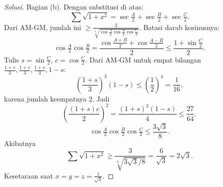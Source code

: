 \documentclass[12pt]{scrartcl}
\begin{document}
\begin{enumerate}
\begin{proof}[Solusi]
	Bagian (b). Dengan substitusi di atas:
	\[ \sum\sqrt{1+x^2} = \sec\tfrac{A}{2} + \sec\tfrac{B}{2} + \sec\tfrac{C}{2}. \]
	Dari AM-GM, jumlah ini $\ge \frac{3}{\sqrt[3]{\cos\frac{A}{2}\cos\frac{B}{2}\cos\frac{C}{2}}}$.
	Batasi darab kosinusnya:
	\[ \cos\tfrac{A}{2}\cos\tfrac{B}{2}
	= \frac{\cos\frac{A+B}{2}+\cos\frac{A-B}{2}}{2}
	\le \frac{1+\sin\frac{C}{2}}{2}. \]
	Tulis $s = \sin\frac{C}{2}$, $c = \cos\frac{C}{2}$. Dari AM-GM untuk empat bilangan
	$\frac{1+s}{3}, \frac{1+s}{3}, \frac{1+s}{3}, 1-s$:
	\[ \left(\frac{1+s}{3}\right)^3(1-s) \le \left(\frac12\right)^4 = \frac{1}{16}, \]
	karena jumlah keempatnya $2$. Jadi
	\[ \left(\frac{(1+s)c}{2}\right)^2 = \frac{(1+s)^3(1-s)}{4} \le \frac{27}{64}, \]
	\[ \cos\tfrac{A}{2}\cos\tfrac{B}{2}\cos\tfrac{C}{2} \le \frac{3\sqrt{3}}{8}. \]
	Akibatnya
	\[ \sum\sqrt{1+x^2} \ge \frac{3}{\sqrt[3]{3\sqrt{3}/8}}
	= \frac{6}{\sqrt{3}} = 2\sqrt{3}. \]
	Kesetaraan saat $x = y = z = \frac{1}{\sqrt{3}}$.
	\end{proof}

\end{enumerate}
\end{document}
